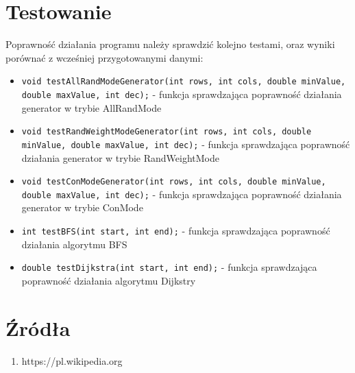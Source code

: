 \documentclass{article}
\begin{document}
\section{Testowanie}
Poprawność działania programu należy sprawdzić kolejno testami, oraz wyniki porównać z wcześniej przygotowanymi danymi:
\begin{itemize}
    \item \texttt{void testAllRandModeGenerator(int rows, int cols, double minValue, double maxValue, int dec);} - funkcja sprawdzająca poprawność działania generator w trybie AllRandMode
    \item \texttt{void testRandWeightModeGenerator(int rows, int cols, double minValue, double maxValue, int dec);} - funkcja sprawdzająca poprawność działania generator w trybie RandWeightMode
    \item \texttt{void testConModeGenerator(int rows, int cols, double minValue, double maxValue, int dec);} - funkcja sprawdzająca poprawność działania generator w trybie ConMode
    
    
    \item \texttt{int testBFS(int start, int end);} - funkcja sprawdzająca poprawność działania algorytmu BFS
    \item \texttt{double testDijkstra(int start, int end);} - funkcja sprawdzająca poprawność działania algorytmu Dijkstry 

\end{itemize}

\section{Źródła}
\begin{enumerate}
    \item https://pl.wikipedia.org
\end{enumerate}
\end{document}
